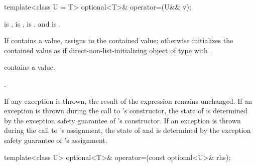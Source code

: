 %
\begin{itemdecl}
template<class U = T> optional<T>& operator=(U&& v);
\end{itemdecl}

\begin{itemdescr}
\pnum
\constraints
{} is ,
 is ,
 is , and
 is .

\pnum
\effects
If  contains a value, assigns  to the contained value; otherwise initializes the contained value as if direct-non-list-initializing object of type  with .

\pnum
\ensures
{} contains a value.

\pnum
\returns
{}.

\pnum
\remarks
If any exception is thrown, the result of the expression  remains unchanged. If an exception is thrown during the call to 's constructor, the state of  is determined by the exception safety guarantee of 's constructor. If an exception is thrown during the call to 's assignment, the state of  and  is determined by the exception safety guarantee of 's assignment.
\end{itemdescr}

%
\begin{itemdecl}
template<class U> optional<T>& operator=(const optional<U>& rhs);
\end{itemdecl}

